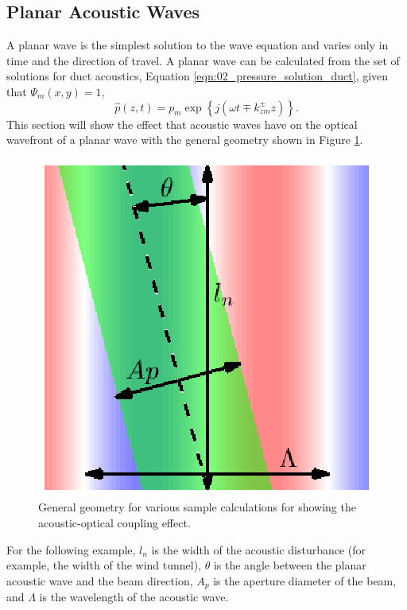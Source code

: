 \subsection{Planar Acoustic Waves}
\label{sect:03_examples_planar}
A planar wave is the simplest solution to the wave equation and varies only in time and the direction of travel.
A planar wave can be calculated from the set of solutions for duct acoustics, Equation \ref{eqn:02_pressure_solution_duct}, given that $\Psi_m(x,y)=1$,
\begin{equation}
  \hat{p}(z,t) = p_m\exp\left\{j(\omega t \mp k_{zm}^\pm z)\right\} \textrm{.}
  \label{eqn:03_plane_wave}
\end{equation}
This section will show the effect that acoustic waves have on the optical wavefront of a planar wave with the general geometry shown in Figure \ref{fig:03_planar_sample_domain}.
\begin{figure}
  \centering
  \includegraphics{../matlab/03_aero_optics_acoustics/planar_sample_domain.eps}
  \caption{General geometry for various sample calculations for showing the acoustic-optical coupling effect.}
  \label{fig:03_planar_sample_domain}
\end{figure}
For the following example, $l_n$ is the width of the acoustic disturbance (for example, the width of the wind tunnel), $\theta$ is the angle between the planar acoustic wave and the beam direction, $A_p$ is the aperture diameter of the beam, and $\Lambda$ is the wavelength of the acoustic wave.

